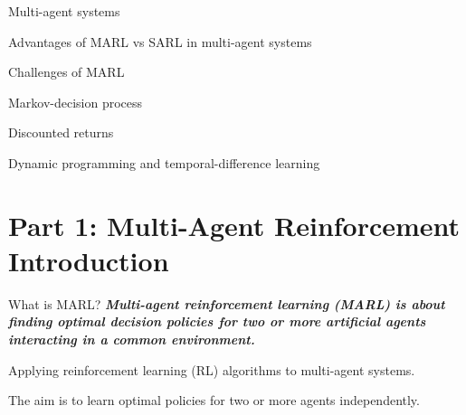 

\leoslide

\subtitle{Introduction}


\maketitle

\introslide

\begin{frame}{\outline}
    \vspace{10pt}
    \vspace{5pt}
    \blist
        \item Multi-agent systems
        \item Advantages of MARL vs SARL in multi-agent systems
        \item Challenges of MARL   
    \elist
    \vspace{10pt}
    \vspace{5pt}
    \blist
        \item Markov-decision process
        \item Discounted returns
        \item Dynamic programming and temporal-difference learning
    \elist
\end{frame}

\section{Part 1: Multi-Agent Reinforcement Introduction}

\begin{frame}{What is MARL?}
		\textbf{\textit{Multi-agent reinforcement learning (MARL) is about finding optimal decision policies for two or more artificial agents interacting in a common environment.}}
  \vspace{20pt}
  \blist
    \item Applying reinforcement learning (RL) algorithms to multi-agent systems. 
    \item The aim is to learn optimal policies for two or more agents independently. 
  \elist
\end{frame}

